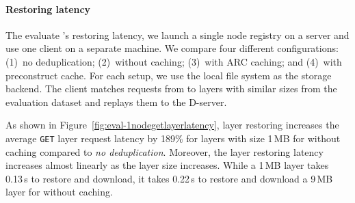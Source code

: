 \paragraph{Restoring latency}
%
%
The evaluate \sysname{}'s restoring latency, we launch a single node registry on a server
and use one client on a separate machine.
%
We compare four different configurations:
(1)~no deduplication;
(2)~\sysname without caching;
(3)~\sysname with ARC caching; and
(4)~\sysname with preconstruct cache.
%
For each setup, we use the local file system as the storage backend.
%
%
The client matches requests from \dal to layers with similar sizes 
from the evaluation dataset and replays them to the D-server.

%
As shown in Figure~\ref{fig:eval-1nodegetlayerlatency}, 
layer restoring increases the average \texttt{GET} layer request latency by 189\% for layers 
with size 1\,MB for \sysname without caching compared to \emph{no deduplication}.
%
Moreover, the layer restoring latency increases almost linearly as the layer size increases.
%
While a 1\,MB layer takes 0.13\,s to restore and download, 
it takes 0.22\,s to restore and download a 9\,MB
layer for \sysname without caching.

